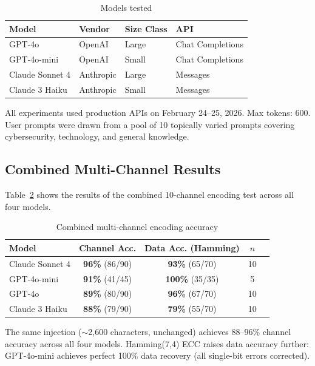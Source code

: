\documentclass[11pt]{article}
\begin{document}
\begin{table}[h]
\centering
\caption{Models tested}
\label{tab:models}
\begin{tabular}{@{}llll@{}}
\toprule
\textbf{Model} & \textbf{Vendor} & \textbf{Size Class} & \textbf{API} \\
\midrule
GPT-4o & OpenAI & Large & Chat Completions \\
GPT-4o-mini & OpenAI & Small & Chat Completions \\
Claude Sonnet 4 & Anthropic & Large & Messages \\
Claude 3 Haiku & Anthropic & Small & Messages \\
\bottomrule
\end{tabular}
\end{table}

All experiments used production APIs on February 24--25, 2026. Max tokens:
600. User prompts were drawn from a pool of 10 topically varied prompts
covering cybersecurity, technology, and general knowledge.

\subsection{Combined Multi-Channel Results}

Table~\ref{tab:combined} shows the results of the combined 10-channel
encoding test across all four models.

\begin{table}[h]
\centering
\caption{Combined multi-channel encoding accuracy}
\label{tab:combined}
\begin{tabular}{@{}lcccl@{}}
\toprule
\textbf{Model} & \textbf{Channel Acc.} & \textbf{Data Acc. (Hamming)} & $n$ \\
\midrule
Claude Sonnet 4 & \textbf{96\%} (86/90) & \textbf{93\%} (65/70) & 10 \\
GPT-4o-mini     & \textbf{91\%} (41/45) & \textbf{100\%} (35/35) & 5 \\
GPT-4o          & \textbf{89\%} (80/90) & \textbf{96\%} (67/70) & 10 \\
Claude 3 Haiku  & \textbf{88\%} (79/90) & \textbf{79\%} (55/70) & 10 \\
\bottomrule
\end{tabular}
\end{table}

The same injection ($\sim$2,600 characters, unchanged) achieves 88--96\%
channel accuracy across all four models. Hamming(7,4) ECC raises data
accuracy further: GPT-4o-mini achieves perfect 100\% data recovery (all
single-bit errors corrected).
\end{document}
